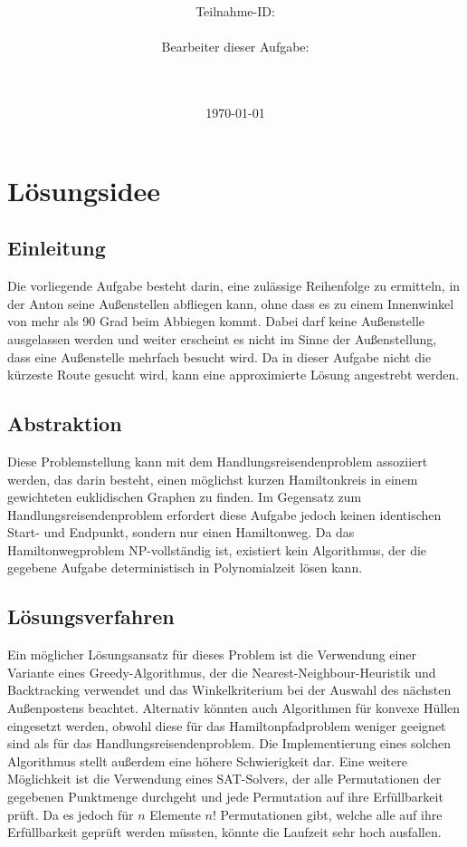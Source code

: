 \documentclass[a4paper,10pt,ngerman]{scrartcl}
\title{\textbf{\Huge\Aufgabe}}
\author{\LARGE Teilnahme-ID: \LARGE \TeilnahmeId \\\\
\LARGE Bearbeiter dieser Aufgabe: \\
\LARGE \Name\\\\}
\date{\LARGE\today}
\begin{document}
    \maketitle
    \tableofcontents
    \vspace{0.5cm}
    \newpage

    \section{Lösungsidee}\label{sec:losungsidee}
    \subsection{Einleitung}\label{subsec:einleitung}

    Die vorliegende Aufgabe besteht darin, eine zulässige Reihenfolge zu ermitteln,
    in der Anton seine Außenstellen abfliegen kann,
    ohne dass es zu einem Innenwinkel von mehr als 90 Grad beim Abbiegen kommt.
    Dabei darf keine Außenstelle ausgelassen werden und weiter erscheint es nicht im Sinne der Außenstellung,
    dass eine Außenstelle mehrfach besucht wird.
    Da in dieser Aufgabe nicht die kürzeste Route gesucht wird, kann eine approximierte Lösung angestrebt werden.

    \subsection{Abstraktion}\label{subsec:abstraktion}

    Diese Problemstellung kann mit dem Handlungsreisendenproblem assoziiert werden,
    das darin besteht, einen möglichst kurzen Hamiltonkreis in einem gewichteten euklidischen Graphen zu finden.
    Im Gegensatz zum Handlungsreisendenproblem erfordert diese Aufgabe jedoch keinen identischen Start- und Endpunkt,
    sondern nur einen Hamiltonweg.
    Da das Hamiltonwegproblem NP-vollständig ist,
    existiert kein Algorithmus, der die gegebene Aufgabe deterministisch in Polynomialzeit lösen kann.
    \subsection{Lösungsverfahren}\label{subsec:losungsverfahren}
    Ein möglicher Lösungsansatz für dieses Problem ist die Verwendung einer Variante eines Greedy-Algorithmus,
    der die Nearest-Neighbour-Heuristik und Backtracking verwendet
    und das Winkelkriterium bei der Auswahl des nächsten Außenpostens beachtet.
    Alternativ könnten auch Algorithmen für konvexe Hüllen eingesetzt werden,
    obwohl diese für das Hamiltonpfadproblem weniger geeignet sind als für das Handlungsreisendenproblem.
    Die Implementierung eines solchen Algorithmus stellt außerdem eine höhere Schwierigkeit dar.
    Eine weitere Möglichkeit ist die Verwendung eines SAT-Solvers, der alle Permutationen der gegebenen Punktmenge durchgeht und
    jede Permutation auf ihre Erfüllbarkeit prüft.
    Da es jedoch für $n$ Elemente $n!$ Permutationen gibt, welche alle auf ihre Erfüllbarkeit geprüft werden müssten,
    könnte die Laufzeit sehr hoch ausfallen.
\end{document}
